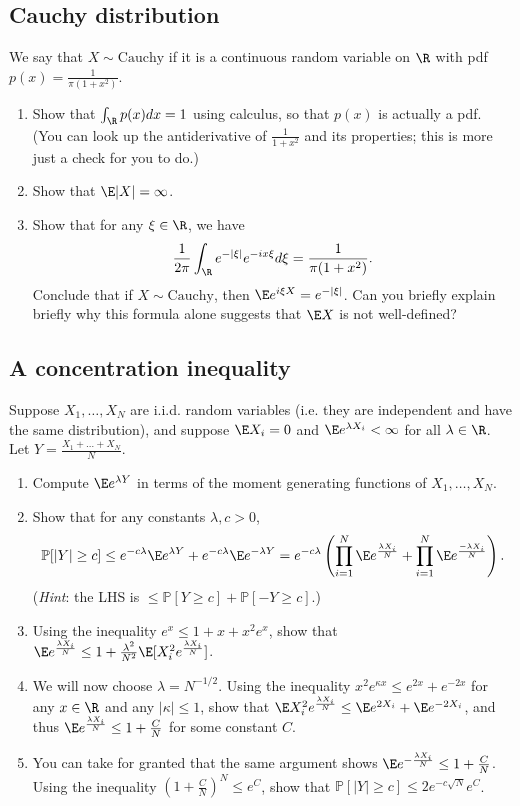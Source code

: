 \documentclass[12pt,reqno]{amsart}
\theoremstyle{definition}
\theoremstyle{remark}
\numberwithin{equation}{section}
\begin{document}
\subsection{Cauchy distribution}
We say that $X\sim\mathrm{Cauchy}$ if it is a continuous random variable on $\R$ with pdf $p(x)=\frac{1}{\pi(1+x^{2})}$.
\begin{enumerate}
\item Show that $\int_{\R}p(x)dx=1$ using calculus, so that $p(x)$ is actually a pdf. (You can look up the antiderivative of $\frac{1}{1+x^{2}}$ and its properties; this is more just a check for you to do.)
\item Show that $\E|X|=\infty$.
\item Show that for any $\xi\in\R$, we have 
%
\begin{align*}
\frac{1}{2\pi}\int_{\R}e^{-|\xi|}e^{-ix\xi}d\xi=\frac{1}{\pi(1+x^{2})}.
\end{align*}
%
Conclude that if $X\sim\mathrm{Cauchy}$, then $\E e^{i\xi X}=e^{-|\xi|}$. Can you briefly explain briefly why this formula alone suggests that $\E X$ is not well-defined?
\end{enumerate}
\subsection{A concentration inequality}\label{subsection:concentration}
Suppose $X_{1},\ldots,X_{N}$ are i.i.d. random variables (i.e. they are independent and have the same distribution), and suppose $\E X_{i}=0$ and $\E e^{\lambda X_{i}}<\infty$ for all $\lambda\in\R$. Let $Y=\frac{X_{1}+\ldots+X_{N}}{N}$.
\begin{enumerate}
\item Compute $\E e^{\lambda Y}$ in terms of the moment generating functions of $X_{1},\ldots,X_{N}$.
\item Show that for any constants $\lambda,c>0$,
%
\begin{align*}
\mathbb{P}[|Y|\geq c]\leq e^{-c\lambda}\E e^{\lambda Y}+e^{-c\lambda}\E e^{-\lambda Y}=e^{-c\lambda}\left(\prod_{i=1}^{N}\E e^{\frac{\lambda X_{i}}{N}}+\prod_{i=1}^{N}\E e^{\frac{-\lambda X_{i}}{N}}\right).
\end{align*}
%
(\emph{Hint}: the LHS is $\leq\mathbb{P}[Y\geq c]+\mathbb{P}[-Y\geq c]$.)
\item Using the inequality $e^{x}\leq1+x+x^{2}e^{x}$, show that $\E e^{\frac{\lambda X_{i}}{N}}\leq1+\frac{\lambda^{2}}{N^{2}}\E[X_{i}^{2}e^{\frac{\lambda X_{i}}{N}}]$.
\item We will now choose $\lambda=N^{-1/2}$. Using the inequality $x^{2}e^{\kappa x}\leq e^{2x}+e^{-2x}$ for any $x\in\R$ and any $|\kappa|\leq1$, show that $\E X_{i}^{2}e^{\frac{\lambda X_{i}}{N}}\leq\E e^{2X_{i}}+\E e^{-2X_{i}}$, and thus $\E e^{\frac{\lambda X_{i}}{N}}\leq 1+\frac{C}{N}$ for some constant $C$.
\item You can take for granted that the same argument shows $\E e^{-\frac{\lambda X_{i}}{N}}\leq 1+\frac{C}{N}$. Using the inequality $(1+\frac{C}{N})^{N}\leq e^{C}$, show that $\mathbb{P}[|Y|\geq c]\leq2e^{-c\sqrt{N}}e^{C}$.
\end{enumerate}
\end{document}
